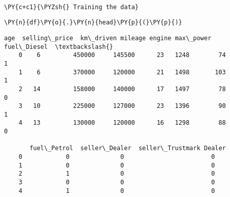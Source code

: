     \begin{center}
    \end{center}
    { \hspace*{\fill} \\}
        
    \begin{tcolorbox}[breakable, size=fbox, boxrule=1pt, pad at break*=1mm,colback=cellbackground, colframe=cellborder]
    \begin{Verbatim}[commandchars=\\\{\}]
    \PY{c+c1}{\PYZsh{} Training the data}
    \end{Verbatim}
    \end{tcolorbox}
    
        \begin{tcolorbox}[breakable, size=fbox, boxrule=1pt, pad at break*=1mm,colback=cellbackground, colframe=cellborder]
    \begin{Verbatim}[commandchars=\\\{\}]
    \PY{n}{df}\PY{o}{.}\PY{n}{head}\PY{p}{(}\PY{p}{)}
    \end{Verbatim}
    \end{tcolorbox}
    
                \begin{tcolorbox}[breakable, size=fbox, boxrule=.5pt, pad at break*=1mm, opacityfill=0]
    \begin{Verbatim}[commandchars=\\\{\}]
       age  selling\_price  km\_driven mileage engine max\_power  fuel\_Diesel  \textbackslash{}
    0    6         450000     145500      23   1248        74            1
    1    6         370000     120000      21   1498       103            1
    2   14         158000     140000      17   1497        78            0
    3   10         225000     127000      23   1396        90            1
    4   13         130000     120000      16   1298        88            0
    
       fuel\_Petrol  seller\_Dealer  seller\_Trustmark Dealer
    0            0              0                        0
    1            0              0                        0
    2            1              0                        0
    3            0              0                        0
    4            1              0                        0
    \end{Verbatim}
    \end{tcolorbox}
            
